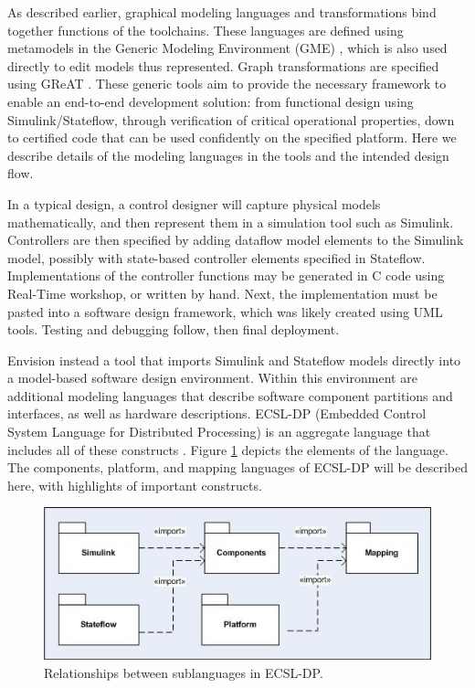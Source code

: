 As described earlier, graphical modeling languages and transformations bind together functions of the toolchains.  These languages are defined using metamodels in the Generic Modeling Environment (GME) \cite{isis:gme}, which is also used directly to edit models thus represented.  Graph transformations are specified using GReAT \cite{isis:great}.  These generic tools aim to provide the necessary framework to enable an end-to-end development solution: from functional design using Simulink/Stateflow, through verification of critical operational properties, down to certified code that can be used confidently on the specified platform.  Here we describe details of the modeling languages in the tools and the intended design flow.

In a typical design, a control designer will capture physical models mathematically, and then represent them in a simulation tool such as Simulink.   Controllers are then specified by adding dataflow model elements to the Simulink model, possibly with state-based controller elements specified in Stateflow. Implementations of the controller functions may be generated in C code using Real-Time workshop, or written by hand.  Next, the implementation must be pasted into a software design framework, which was likely created using UML tools.  Testing and debugging follow, then  final deployment.

Envision instead a tool that imports Simulink and Stateflow models directly into a model-based software design environment.  Within this environment are additional modeling languages that describe software component partitions and interfaces, as well as hardware descriptions.   ECSL-DP (Embedded Control System Language for Distributed Processing) is an aggregate language that includes all of these constructs \cite{KS:ISIS-04-505}. Figure \ref{fig:packages} depicts the elements of the language.  The components, platform, and mapping languages of ECSL-DP will be described here, with highlights of important constructs.

\begin{figure}[h]
\begin{center}
   \includegraphics[width=0.9\columnwidth]{packages}
   \caption{Relationships between sublanguages in ECSL-DP.}
   \label{fig:packages}
\end{center}
\end{figure}

